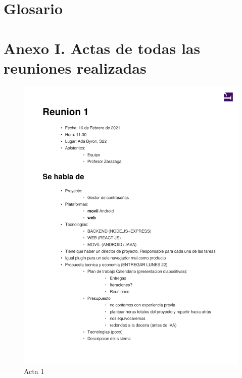 \documentclass{article}
\begin{document}
\section*{Glosario}

\section*{Anexo I. Actas de todas las reuniones realizadas}
\begin{figure}
    \includegraphics[width=.8\textwidth]{../../actas_reuniones/acta1.pdf}
    \caption{Acta 1}
\end{figure}
\end{document}
